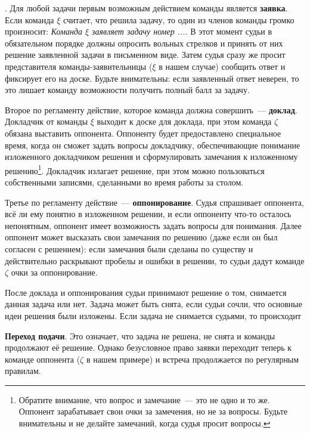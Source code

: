 \documentclass[12pt]{article}
\begin{document}
. Для любой задачи первым возможным действием команды является {\bf заявка}. Если команда $\xi$ считает, что решила задачу, то один из членов команды громко произносит: \textsl{Команда $\xi$ заявляет задачу номер ...}. В этот момент судьи в обязательном порядке должны опросить вольных стрелков и принять от них решение заявленной задачи в письменном виде. Затем судья сразу же просит представителя команды-заявительницы ($\xi$ в нашем случае) сообщить ответ и фиксирует его на доске. Будьте внимательны: если заявленный ответ неверен, то это лишает команду возможности получить полный балл за задачу.

Второе по регламенту действие, которое команда должна совершить~--- {\bf доклад}. Докладчик от команды $\xi$ выходит к доске для доклада, при этом команда $\zeta$ обязана выставить оппонента. Оппоненту будет предоставлено специальное время, когда он сможет задать вопросы докладчику, обеспечивающие понимание изложенного докладчиком решения и сформулировать замечания к изложенному решению\footnote{Обратите внимание, что вопрос и замечание~--- это не одно и то же. Оппонент зарабатывает свои очки за замечения, но не за вопросы. Будьте внимательны и не делайте замечаний, когда судья просит вопросы.}. Докладчик излагает решение, при этом можно пользоваться собственными записями, сделанными во время работы за столом.

Третье по регламенту действие~--- \textbf{оппонирование}. Судья спрашивает оппонента, всё ли ему понятно в изложенном решении, и если оппоненту что-то осталось непонятным, оппонент имеет возможность задать вопросы для понимания. Далее оппонент может высказать свои замечания по решению (даже если он был согласен с решением): если замечания были сделаны по существу и действительно раскрывают пробелы и ошибки в решении, то судьи дадут команде $\zeta$ очки за оппонирование.

После доклада и оппонирования судьи принимают решение о том, снимается данная задача или нет. Задача может быть снята, если судьи сочли, что основные идеи решения были изложены. Если задача не снимается судьями, то происходит

\noindent\textbf{Переход подачи}. Это означает, что задача не решена, не снята и команды продолжают её решение. Однако безусловное право заявки переходит теперь к команде оппонента ($\zeta$ в нашем примере) и встреча продолжается по регулярным правилам.
\end{document}
